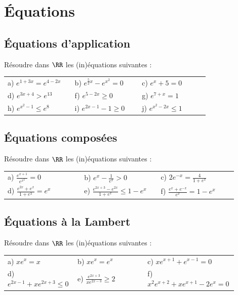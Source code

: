\documentclass[oneside,12pt]{book}          %
\begin{document}
\section{Équations}

\subsection{Équations d'application}
Résoudre dans $\RR$ les (in)équations suivantes :

\renewcommand{\arraystretch}{1.3}
\begin{tabular}{p{0.3\linewidth}p{0.3\linewidth}p{0.3\linewidth}}
    a) $e^{1+3x} = e^{4-2x}$ & b) $e^{\frac{5}{2}x} - e^{x^2} = 0$ & c) $e^x + 5 = 0$ \\
    d) $e^{3x+4} > e^{13}$ & f) $e^{5-2x} \geq 0$ & g) $e^{7+x} = 1$ \\
    h) $e^{x^2-1} \leq e^8$ & i) $e^{2x-1} - 1 \geq 0$ & j) $e^{x^2 - 2x} \leq 1$
\end{tabular}



\subsection{Équations composées}
Résoudre dans $\RR$ les (in)équations suivantes :

\renewcommand{\arraystretch}{1.5}
\begin{tabular}{p{0.3\linewidth}p{0.3\linewidth}p{0.3\linewidth}}
    a) $\frac{e^{x+1}}{e^{x^2}} = 0$ & b) $e^x-\frac{1}{e^x} > 0$ & c) $2e^{-x}=\frac{4}{1 + e^x}$\\
    d) $\frac{e^{2x} + e^x}{1 + e^3} = e^x$ & e) $\frac{e^{2x+3} - e^{2x}}{1 + e^x} \leq 1 - e^x$ & f) $\frac{e^x + e^{-x}}{e^x} = 1 - e^x$ \\
\end{tabular}



\subsection{Équations à la Lambert}
Résoudre dans $\RR$ les (in)équations suivantes :

\renewcommand{\arraystretch}{1.3}
\begin{tabular}{p{0.3\linewidth}p{0.3\linewidth}p{0.3\linewidth}}
    a) $x e^x = x$ & b)  $x e^x = e^x$ & c)  $x e^{x+1} + e^{x-1} = 0$\\
    d) $e^{2x-1} + x e^{2x+3} \leq 0$ & e) $\frac{e^{2x+3}}{x e^{2x-3}} \geq 2$ & f) $x^2 e^{x+2} + x e^{x+1} - 2e^x = 0$\\
\end{tabular}
\end{document}
